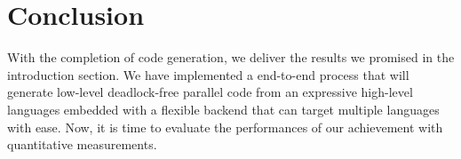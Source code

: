 \section{Conclusion}
With the completion of code generation, we deliver the results we promised in the introduction section. We have implemented a end-to-end process that will generate low-level deadlock-free parallel code from an expressive high-level languages embedded with a flexible backend that can target multiple languages with ease. Now, it is time to evaluate the performances of our achievement with quantitative measurements.
